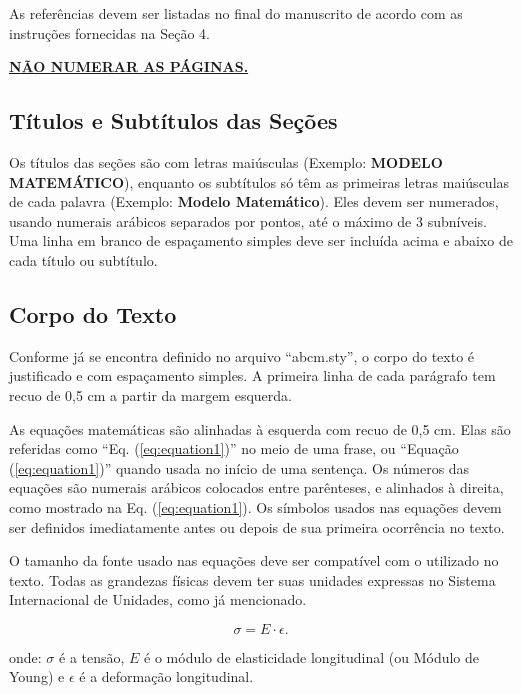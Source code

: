 \documentclass[10pt,fleqn,a4paper,twoside]{article}
\begin{document}
        As referências devem ser listadas no final do manuscrito de acordo com as instruções fornecidas na Seção 4.


        \textbf{\textcolor[rgb]{0.98,0.00,0.00}{\underline{NÃO NUMERAR AS PÁGINAS.}}}

    \subsection{Títulos e Subtítulos das Seções }

        Os títulos das seções são com letras maiúsculas (Exemplo: \textbf{MODELO MATEMÁTICO}), enquanto os subtítulos só têm as primeiras letras maiúsculas de cada palavra (Exemplo: \textbf{Modelo Matemático}). Eles devem ser numerados, usando numerais arábicos separados por pontos, até o máximo de 3 subníveis. Uma linha em branco de espaçamento simples deve ser incluída acima e abaixo de cada título ou subtítulo.

    \subsection{Corpo do Texto}

        Conforme já se encontra definido no arquivo ``abcm.sty'', o corpo do texto é justificado e com espaçamento simples. A primeira linha de cada parágrafo tem recuo de 0,5 cm a partir da margem esquerda.

        As equações matemáticas são alinhadas à esquerda com recuo de 0,5 cm.  Elas são referidas como ``Eq. (\ref{eq:equation1})'' no meio de uma frase, ou ``Equação (\ref{eq:equation1})'' quando usada no início de uma sentença. Os números das equações são numerais arábicos colocados entre parênteses, e alinhados à direita, como mostrado na Eq. (\ref{eq:equation1}). Os símbolos usados nas equações devem ser definidos imediatamente antes ou depois de sua primeira ocorrência no texto.

        O tamanho da fonte usado nas equações deve ser compatível com o utilizado no texto. Todas as grandezas físicas devem ter suas unidades expressas no Sistema Internacional de Unidades, como já mencionado.

        \begin{equation}
        \sigma = E \cdot \epsilon. \label{eq:equation1}
        \end{equation}
    
    	\noindent
    	onde: $\sigma$ é a tensão, $E$ é o módulo de elasticidade longitudinal (ou Módulo de Young) e $\epsilon$ é a deformação longitudinal.
\end{document}
